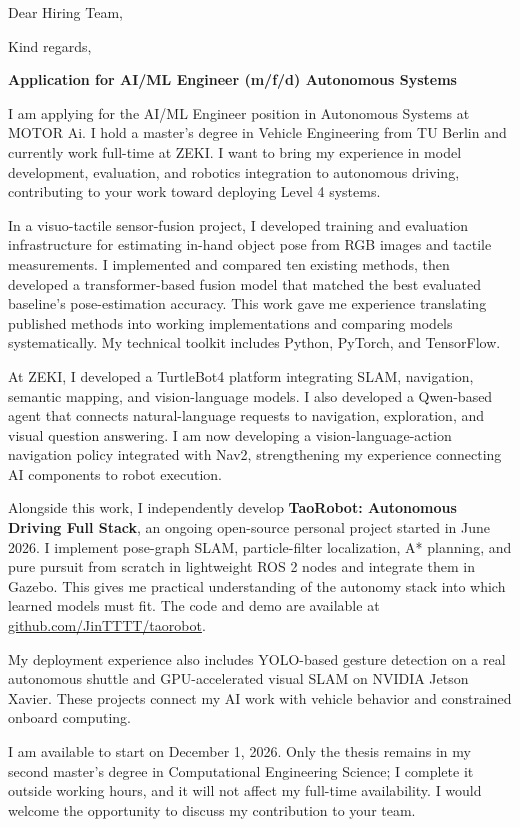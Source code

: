 \documentclass[11pt,a4paper,sans]{moderncv}
\begin{document}
\date{\today}
\opening{Dear Hiring Team,}
\closing{Kind regards,}
\makelettertitle

\textbf{Application for AI/ML Engineer (m/f/d) Autonomous Systems}

\justifying
\setlength{\parindent}{0pt}

I am applying for the AI/ML Engineer position in Autonomous Systems at MOTOR Ai. I hold a master's degree in Vehicle Engineering from TU Berlin and currently work full-time at ZEKI. I want to bring my experience in model development, evaluation, and robotics integration to autonomous driving, contributing to your work toward deploying Level 4 systems.

In a visuo-tactile sensor-fusion project, I developed training and evaluation infrastructure for estimating in-hand object pose from RGB images and tactile measurements. I implemented and compared ten existing methods, then developed a transformer-based fusion model that matched the best evaluated baseline's pose-estimation accuracy. This work gave me experience translating published methods into working implementations and comparing models systematically. My technical toolkit includes Python, PyTorch, and TensorFlow.

At ZEKI, I developed a TurtleBot4 platform integrating SLAM, navigation, semantic mapping, and vision-language models. I also developed a Qwen-based agent that connects natural-language requests to navigation, exploration, and visual question answering. I am now developing a vision-language-action navigation policy integrated with Nav2, strengthening my experience connecting AI components to robot execution.

Alongside this work, I independently develop \textbf{TaoRobot: Autonomous Driving Full Stack}, an ongoing open-source personal project started in June 2026. I implement pose-graph SLAM, particle-filter localization, A* planning, and pure pursuit from scratch in lightweight ROS 2 nodes and integrate them in Gazebo. This gives me practical understanding of the autonomy stack into which learned models must fit. The code and demo are available at \href{https://github.com/JinTTTT/taorobot}{github.com/JinTTTT/taorobot}.

My deployment experience also includes YOLO-based gesture detection on a real autonomous shuttle and GPU-accelerated visual SLAM on NVIDIA Jetson Xavier. These projects connect my AI work with vehicle behavior and constrained onboard computing.

I am available to start on December 1, 2026. Only the thesis remains in my second master's degree in Computational Engineering Science; I complete it outside working hours, and it will not affect my full-time availability. I would welcome the opportunity to discuss my contribution to your team.

\makeletterclosing
\end{document}
